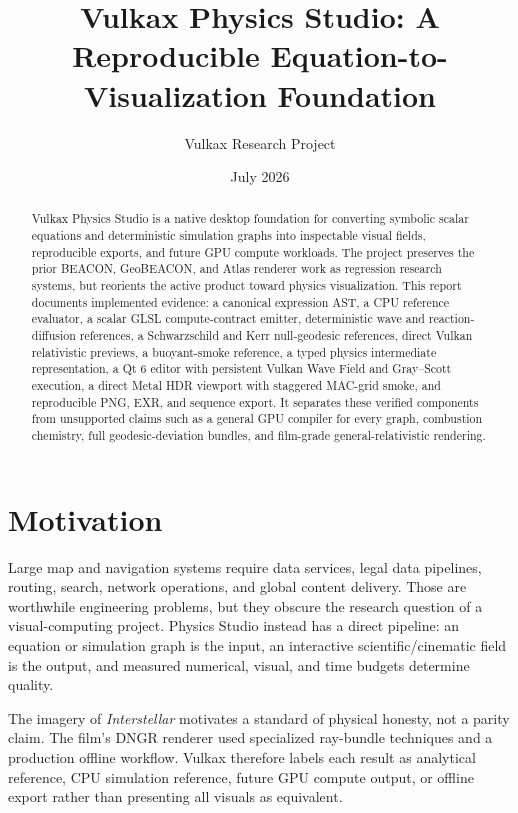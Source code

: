 \documentclass[10pt]{article}
\title{Vulkax Physics Studio: A Reproducible Equation-to-Visualization Foundation}
\author{Vulkax Research Project}
\date{July 2026}
\begin{document}
\maketitle

\begin{abstract}
Vulkax Physics Studio is a native desktop foundation for converting symbolic scalar equations and
deterministic simulation graphs into inspectable visual fields, reproducible exports, and future
GPU compute workloads. The project preserves the prior BEACON, GeoBEACON, and Atlas renderer work
as regression research systems, but reorients the active product toward physics visualization.
This report documents implemented evidence: a canonical expression AST, a CPU reference evaluator,
a scalar GLSL compute-contract emitter, deterministic wave and reaction-diffusion references, a
Schwarzschild and Kerr null-geodesic references, direct Vulkan relativistic previews, a buoyant-smoke
reference, a typed physics intermediate representation, a Qt 6 editor with persistent Vulkan Wave
Field and Gray--Scott execution, a direct Metal HDR viewport with staggered MAC-grid smoke, and
reproducible PNG, EXR, and sequence export. It separates these verified components from unsupported
claims such as a general GPU compiler for every graph, combustion chemistry, full geodesic-deviation
bundles, and film-grade general-relativistic rendering.
\end{abstract}

\section{Motivation}

Large map and navigation systems require data services, legal data pipelines, routing, search,
network operations, and global content delivery. Those are worthwhile engineering problems, but
they obscure the research question of a visual-computing project. Physics Studio instead has a
direct pipeline: an equation or simulation graph is the input, an interactive scientific/cinematic
field is the output, and measured numerical, visual, and time budgets determine quality.

The imagery of \emph{Interstellar} motivates a standard of physical honesty, not a parity claim.
The film's DNGR renderer used specialized ray-bundle techniques and a production offline workflow.
Vulkax therefore labels each result as analytical reference, CPU simulation reference, future GPU
compute output, or offline export rather than presenting all visuals as equivalent.
\end{document}
